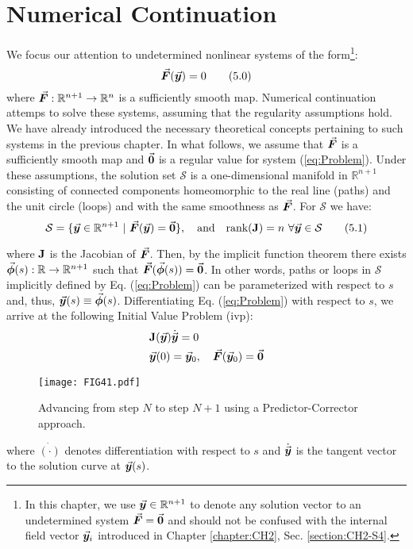 \section{Numerical Continuation}
We focus our attention to undetermined nonlinear systems of the 
form\footnote{In this chapter, we use $\vec{\bm{y}}\in\mathbb{R}^{n+1}$ to denote 
any solution vector to an undetermined system $\vec{\bm{F}}=\vec{\bm{0}}$ and should 
not be confused with the internal field vector $\vec{\bm{y}}_i$ introduced in 
Chapter \ref{chapter:CH2}, Sec. \ref{section:CH2-S4}.}:
\begin{equation}
	\vec{\bm{F}}(\vec{\bm{y}})=0
	\tag{5.0}\label{eq:Problem}
\end{equation}
where $\vec{\bm{F}}:\mathbb{R}^{n+1}\rightarrow\mathbb{R}^n$ is a sufficiently 
smooth
map. Numerical continuation attemps to solve these systems, assuming that the 
regularity assumptions hold. We have already introduced the necessary 
theoretical concepts pertaining to such systems in the previous chapter. In 
what follows, we assume that $\vec{\bm{F}}$ is a sufficiently smooth map and 
$\vec{\bm{0}}$ is a regular value for system (\ref{eq:Problem}). Under these 
assumptions, the solution set
$\mathcal{S}$ is a one-dimensional manifold in
$\mathbb{R}^{n+1}$ consisting of connected components homeomorphic to the real
line (paths) and the unit circle (loops) and with the same smoothness as
$\vec{\bm{F}}$. For $\mathcal{S}$ we have:
\begin{equation}
	\mathcal{S}=\{\bvec{y}\in\mathbb{R}^{n+1}\ |\ 
	\bvec{F}(\bvec{y})=\bvec{0}\},\quad \text{and}\quad 
	\text{rank}(\bmat{J})=n\ \forall\bvec{y}\in\mathcal{S}
	\tag{5.1}\label{eq:SolutionSet}
\end{equation}

\noindent where $\mathbf{J}$ is the Jacobian of $\vec{\bm{F}}$. Then,  by the 
implicit
function theorem there exists 
$\vec{\bm{\phi}}(s):\mathbb{R}\rightarrow\mathbb{R}^{n+1}$
such that $\vec{\bm{F}}(\vec{\bm{\phi}}(s))=\vec{\bm{0}}$. In other words, paths or loops in
$\mathcal{S}$ implicitly defined by Eq. (\ref{eq:Problem}) can be parameterized 
with
respect to $s$ and, thus, $\vec{\bm{y}}(s)\equiv\vec{\bm{\phi}}(s)$. Differentiating Eq.
(\ref{eq:Problem}) with respect to $s$, we arrive
at the following Initial Value Problem (\acrshort{ivp}):
\begin{subequations}
	\begin{align}
		&\mathbf{J}(\vec{\bm{y}})\dot{\vec{\bm{y}}}=0\label{eq:IVP1}\\
		&\vec{\bm{y}}(0)=\vec{\bm{y}}_0,\quad \vec{\bm{F}}(\vec{\bm{y}}_0)=\vec{\bm{0}}	
		\label{eq:IVP2}
	\end{align}
	\label{eq:IVP}
\end{subequations}
\begin{figure}[t]
	\centering
	\texttt{[image: FIG41.pdf]}
	\caption{Advancing from step $N$ to step $N+1$ using a Predictor-Corrector 
	approach.}
	\label{fig:FIG41}
\end{figure}
where $\dot{(\cdot)}$ denotes differentiation with respect to $s$ and 
$\dot{\vec{\bm{y}}}$ is the tangent vector to the solution curve at $\vec{\bm{y}}(s)$. 

